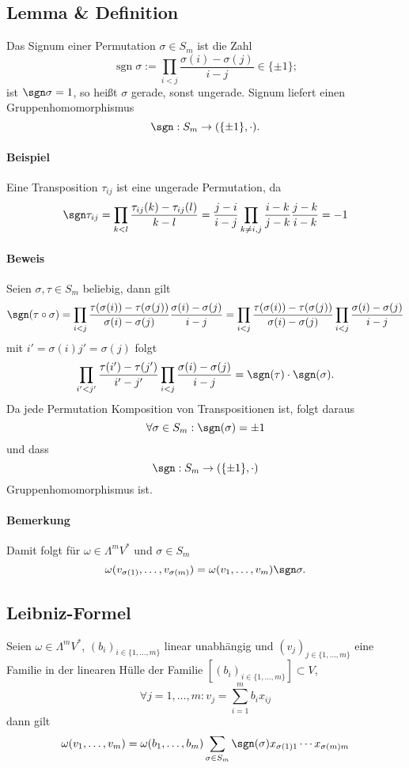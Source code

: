 \subsection{Lemma \& Definition}
	\begin{Definition}
	Das Signum einer Permutation $ \sigma\in S_m $ ist die Zahl
		\[ \operatorname{sgn}\sigma := \prod_{i<j} \frac{\sigma(i)-\sigma(j)}{i-j}\in \{\pm 1\}; \]
	ist $ \sgn\sigma = 1 $, so heißt $ \sigma $ gerade, sonst ungerade. Signum liefert einen Gruppenhomomorphismus
		\[ \sgn: S_m\to (\{\pm 1\},\cdot). \]
	\end{Definition}
\paragraph{Beispiel}
	Eine Transposition $ \tau_{ij} $ ist eine ungerade Permutation, da
		\[ \sgn\tau_{ij} = \prod_{k<l}\frac{\tau_{ij}(k)-\tau_{ij}(l)}{k-l} = \frac{j-i}{i-j}\prod_{k\neq i,j}\frac{i-k}{j-k}\frac{j-k}{i-k} = -1 \]
\paragraph{Beweis}
	Seien $ \sigma,\tau\in S_m $ beliebig, dann gilt
	\[ \sgn(\tau\circ\sigma) = \prod_{i<j}\frac{\tau(\sigma(i))-\tau(\sigma(j))}{\sigma(i)-\sigma(j)}\frac{\sigma(i)-\sigma(j)}{i-j} = \prod_{i<j}\frac{\tau(\sigma(i))-\tau(\sigma(j))}{\sigma(i)-\sigma(j)}\prod_{i<j}\frac{\sigma(i)-\sigma(j)}{i-j} \]
	mit $ i'=\sigma(i)j'=\sigma(j) $ folgt
	\[ \prod_{i'<j'}\frac{\tau(i')-\tau(j')}{i'-j'}\prod_{i<j}\frac{\sigma(i)-\sigma(j)}{i-j} = \sgn(\tau)\cdot \sgn(\sigma). \]
	Da jede Permutation Komposition von Transpositionen ist, folgt daraus
		\[ \forall \sigma \in S_m:\sgn(\sigma) = \pm 1 \]
	und dass
		\[ \sgn:S_m \to (\{\pm 1\},\cdot) \]
	Gruppenhomomorphismus ist.
\paragraph{Bemerkung}
	Damit folgt für $ \omega\in \Lambda^mV^* $ und $ \sigma \in S_m $
		\[ \omega(v_{\sigma(1)},\dots,v_{\sigma(m)}) =\omega(v_1,\dots,v_m)\sgn\sigma. \]
\subsection{Leibniz-Formel}
	\begin{Satz}
		Seien $ \omega\in \Lambda^mV^* $, $ (b_i)_{i\in \{1,\dots,m\}} $ linear unabhängig und $ (v_j)_{j\in \{1,\dots,m\}} $ eine Familie in der linearen Hülle der Familie $ [(b_i)_{i\in\{1,\dots,m\}}] \subset V$,
		\[ \forall j=1,\dots,m: v_j = \sum_{i=1}^{m}b_ix_{ij} \]
	dann gilt
		\[ \omega(v_1,\dots,v_m)=\omega(b_1,\dots,b_m)\sum_{\sigma\in S_m}\sgn(\sigma)x_{\sigma(1)1} \cdots x_{\sigma(m)m} \]
	\end{Satz}
